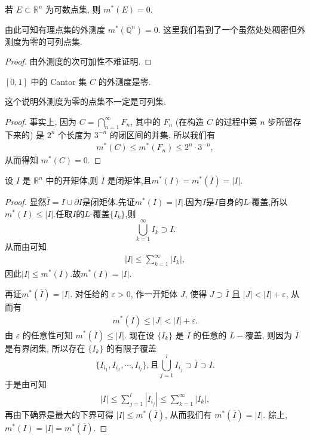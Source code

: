\documentclass[../../main.tex]{subfiles}%
\begin{document}
\begin{corollary}
若 \(E \subset \mathbb{R}^n\) 为可数点集, 则 \(m^*(E) = 0\).
\end{corollary}
\begin{remark}
由此可知有理点集的外测度 \(m^*(\mathbb{Q}^n)=0\). 这里我们看到了一个虽然处处稠密但外测度为零的可列点集.
\end{remark}
\begin{proof}
由外测度的次可加性不难证明.
\end{proof}

\begin{proposition}\label{proposition:Cantor集的外测度是零}
\([0,1]\) 中的 Cantor 集 \(C\) 的外测度是零.
\end{proposition}
\begin{remark}
这个说明外测度为零的点集不一定是可列集.
\end{remark}
\begin{proof}
事实上, 因为 \(C = \bigcap_{n = 1}^{\infty} F_n\), 其中的 \(F_n\) (在构造 \(C\) 的过程中第 \(n\) 步所留存下来的) 是 \(2^n\) 个长度为 \(3^{-n}\) 的闭区间的并集, 所以我们有
\begin{align*}
m^*(C) \leqslant  m^*(F_n) \leqslant  2^n \cdot 3^{-n},
\end{align*}
从而得知 \(m^*(C)=0\). 
\end{proof}

\begin{proposition}
设 \(I\) 是 \(\mathbb{R}^n\) 中的开矩体,则  \(\overline{I}\) 是闭矩体,且\(m^*(I) = m^*(\overline{I}) = |I|\). 
\end{proposition}
\begin{proof}
显然$\overline{I}=I\cup \partial I$是闭矩体.先证$m^*(I)=|I|$.因为$I$是$I$自身的$L$-覆盖,所以$m^*(I)\leqslant |I|$.任取$I$的$L$-覆盖$\{I_k\}$,则
\[
\bigcup_{k = 1}^{\infty} I_{k} \supset I.
\]
从而由可知
\begin{align*}
|I| \leqslant \sum_{k = 1}^{\infty} |I_k|,
\end{align*}
因此\(|I| \leqslant m^*(I)\).故$m^*(I)=|I|.$

再证$m^*(\overline{I})=|I|$.
对任给的 \(\varepsilon > 0\), 作一开矩体 \(J\), 使得 \(J \supset \overline{I}\) 且 \(|J| < |I| + \varepsilon\), 从而有
\begin{align*}
m^*(\overline{I}) \leqslant  |J| < |I| + \varepsilon.
\end{align*}
由 \(\varepsilon\) 的任意性可知 \(m^*(\overline{I}) \leqslant  |I|\). 现在设 \(\{I_k\}\) 是 \(\overline{I}\) 的任意的 \(L -\)覆盖, 则因为 \(\overline{I}\) 是有界闭集, 所以存在 \(\{I_k\}\) 的有限子覆盖
\[
\{I_{i_1}, I_{i_2}, \cdots, I_{i_l}\},\text{且}\bigcup_{j = 1}^l I_{i_j} \supset \overline{I}\supset I.
\]
于是由可知
\begin{align*}
|I| \leqslant  \sum_{j = 1}^l |I_{i_j}| \leqslant  \sum_{k = 1}^{\infty} |I_k|,
\end{align*}
再由下确界是最大的下界可得 \(|I| \leqslant  m^*(\overline{I})\), 从而我们有 \(m^*(\overline{I}) = |I|\). 
综上,$m^*(I)=|I|=m^*(\overline{I})$.
\end{proof}
\end{document}
